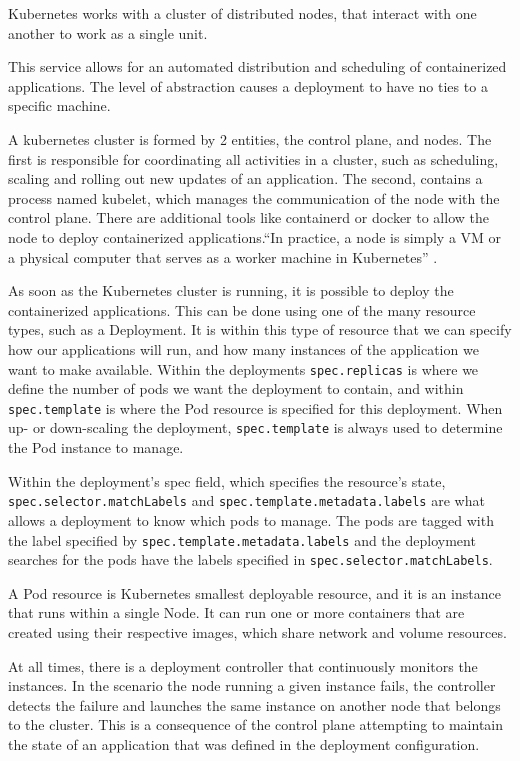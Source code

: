 Kubernetes works with a cluster of distributed nodes, that interact with one
another to work as a single unit.

This service allows for an automated distribution and scheduling of
containerized applications. The level of abstraction causes a deployment to have
no ties to a specific machine.

A kubernetes cluster is formed by 2 entities, the control plane, and nodes. The
first is responsible for coordinating all activities in a cluster, such as
scheduling, scaling and rolling out new updates of an application. The second,
contains a process named kubelet, which manages the communication of the node
with the control plane. There are additional tools like containerd or docker to
allow the node to deploy containerized applications.``In practice, a node is
simply a VM or a physical computer that serves as a worker machine in
Kubernetes'' \cite{CreateKubeCluster}.

As soon as the Kubernetes cluster is running, it is possible to deploy the
containerized applications. This can be done using one of the many resource
types, such as a Deployment. It is within this type of resource that we can
specify how our applications will run, and how many instances of the application
we want to make available. Within the deployments \lstinline{spec.replicas} is
where we define the number of pods we want the deployment to contain, and within
\lstinline{spec.template} is where the Pod resource is specified for this
deployment. When up- or down-scaling the deployment, \lstinline{spec.template}
is always used to determine the Pod instance to manage.

Within the deployment's spec field, which specifies the resource's state,
\lstinline{spec.selector.matchLabels} and
\lstinline{spec.template.metadata.labels} are what allows a deployment to know
which pods to manage. The pods are tagged with the label specified by
\lstinline{spec.template.metadata.labels} and the deployment searches for the
pods have the labels specified in \lstinline{spec.selector.matchLabels}. 

A Pod resource is Kubernetes smallest deployable resource, and it is an instance
that runs within a single Node. It can run one or more containers that are
created using their respective images, which share network and volume resources.

At all times, there is a deployment controller that continuously monitors the
instances. In the scenario the node running a given instance fails, the
controller detects the failure and launches the same instance on another node
that belongs to the cluster. This is a consequence of the control plane
attempting to maintain the state of an application that was defined in the
deployment configuration.

